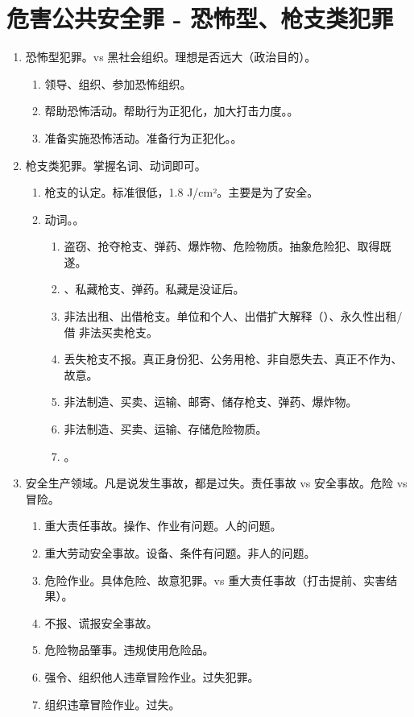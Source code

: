 \section{危害公共安全罪 - 恐怖型、枪支类犯罪}
\begin{enumerate}
  \item 恐怖型犯罪。vs 黑社会组织。理想是否远大（政治目的）。
        \begin{enumerate}
          \item 领导、组织、参加恐怖组织。
          \item 帮助恐怖活动。帮助行为正犯化，加大打击力度。。
          \item 准备实施恐怖活动。准备行为正犯化。。
        \end{enumerate}
  \item 枪支类犯罪。掌握名词、动词即可。
        \begin{enumerate}
          \item 枪支的认定。标准很低，1.8 J/cm²。主要是为了安全。
          \item 动词。。
                \begin{enumerate}
                  \item 盗窃、抢夺枪支、弹药、爆炸物、危险物质。抽象危险犯、取得既遂。
                  \item {}、私藏枪支、弹药。私藏是没证后。
                  \item 非法出租、出借枪支。单位和个人、出借扩大解释（）、永久性出租/借 \yjt 非法买卖枪支。
                  \item 丢失枪支不报。真正身份犯、公务用枪、非自愿失去、真正不作为、故意。
                  \item 非法制造、买卖、运输、邮寄、储存枪支、弹药、爆炸物。
                  \item 非法制造、买卖、运输、存储危险物质。
                  \item {}。
                \end{enumerate}
        \end{enumerate}
  \item 安全生产领域。凡是说发生事故，都是过失。责任事故 vs 安全事故。危险 vs 冒险。
        \begin{enumerate}
          \item 重大责任事故。操作、作业有问题。人的问题。
          \item 重大劳动安全事故。设备、条件有问题。非人的问题。
          \item 危险作业。具体危险、故意犯罪。vs 重大责任事故（打击提前、实害结果）。
          \item 不报、谎报安全事故。
          \item 危险物品肇事。违规使用危险品。
          \item 强令、组织他人违章冒险作业。过失犯罪。
          \item 组织违章冒险作业。过失。
        \end{enumerate}
\end{enumerate}
